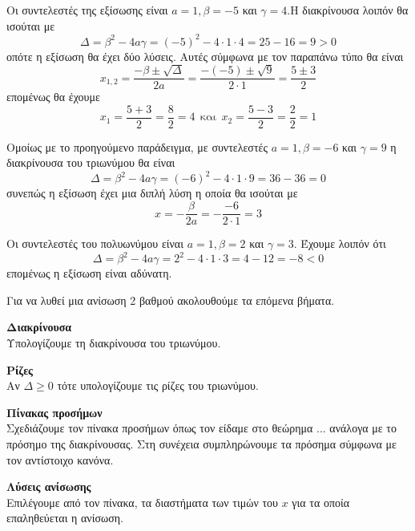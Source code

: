 \lysh
\begin{alist}
\item Οι συντελεστές της εξίσωσης είναι $ a=1,\beta=-5 $ και $ \gamma=4 $.Η διακρίνουσα λοιπόν θα ισούται με
\[ \varDelta=\beta^2-4a\gamma=(-5)^2-4\cdot 1\cdot 4=25-16=9>0 \]
οπότε η εξίσωση θα έχει δύο λύσεις. Αυτές σύμφωνα με τον παραπάνω τύπο θα είναι
\[ x_{1,2}=\frac{-\beta\pm\sqrt{\varDelta}}{2a}=\frac{-(-5)\pm\sqrt{9}}{2\cdot 1}=\frac{5\pm 3}{2} \]
επομένως θα έχουμε
\[ x_1=\frac{5+3}{2}=\frac{8}{2}=4\ \ \textrm{και}\ \ x_2=\frac{5-3}{2}=\frac{2}{2}=1 \]
\item Ομοίως με το προηγούμενο παράδειγμα, με συντελεστές $ a=1,\beta=-6 $ και $ \gamma=9 $ η διακρίνουσα του τριωνύμου θα είναι
\[ \varDelta=\beta^2-4a\gamma=(-6)^2-4\cdot1\cdot9=36-36=0 \]
συνεπώς η εξίσωση έχει μια διπλή λύση η οποία θα ισούται με \[ x=-\frac{\beta}{2a}=-\frac{-6}{2\cdot 1}=3 \]
\item Οι συντελεστές του πολυωνύμου είναι $ a=1,\beta=2 $ και $ \gamma=3 $. Έχουμε λοιπόν ότι
\[ \varDelta=\beta^2-4a\gamma=2^2-4\cdot1\cdot3=4-12=-8<0 \] επομένως η εξίσωση είναι αδύνατη.
\end{alist}
\begin{Methodos}{9cm}
Για να λυθεί μια ανίσωση 2 βαθμού ακολουθούμε τα επόμενα βήματα.
\begin{bhma}
\item\textbf{Διακρίνουσα}\\
Υπολογίζουμε τη διακρίνουσα του τριωνύμου.
\item \textbf{Ρίζες}\\
Αν $ \varDelta\geq 0 $ τότε υπολογίζουμε τις ρίζες του τριωνύμου.
\item \textbf{Πίνακας προσήμων}\\
Σχεδιάζουμε τον πίνακα προσήμων όπως τον είδαμε στο θεώρημα ... ανάλογα με το πρόσημο της διακρίνουσας. Στη συνέχεια συμπληρώνουμε τα πρόσημα σύμφωνα με τον αντίστοιχο κανόνα.
\item\textbf{Λύσεις ανίσωσης}\\
Επιλέγουμε από τον πίνακα, τα διαστήματα των τιμών του $ x $ για τα οποία επαληθεύεται η ανίσωση.
\end{bhma}
\end{Methodos}
